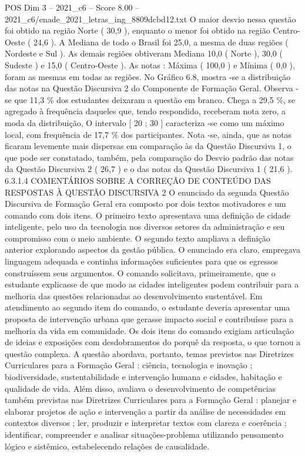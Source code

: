 \begin{textsample}{POS Dim 3 – 2021\_c6 – Score 8.00 – 2021\_c6/enade\_2021\_letras\_ing\_8809dcbd12.txt}
O maior desvio nessa questão foi obtido na região Norte ( 30,9 ), enquanto o menor foi obtido na região Centro-Oeste ( 24,6 ).
A Mediana de todo o Brasil foi 25,0, a mesma de duas regiões ( Nordeste e Sul ).
As demais regiões obtiveram Mediana 10,0 ( Norte ), 30,0 ( Sudeste ) e 15,0 ( Centro-Oeste ).
As notas : Máxima ( 100,0 ) e Mínima ( 0,0 ), foram as mesmas em todas as regiões.
No Gráfico 6.8, mostra -se a distribuição das notas na Questão Discursiva 2 do Componente de Formação Geral.
Observa -se que 11,3 \% dos estudantes deixaram a questão em branco.
Chega a 29,5 \%, se agregado à frequência daqueles que, tendo respondido, receberam nota zero, a moda da distribuição, O intervalo [ 20 ; 30 ] caracteriza -se como um máximo local, com frequência de 17,7 \% dos participantes.
Nota -se, ainda, que as notas ficaram levemente mais dispersas em comparação às da Questão Discursiva 1, o que pode ser constatado, também, pela comparação do Desvio padrão das notas da Questão Discursiva 2 ( 26,7 ) e o das notas da Questão Discursiva 1 ( 21,6 ). 6.3.1.4 COMENTÁRIOS SOBRE A CORREÇÃO DE CONTEÚDO DAS RESPOSTAS À QUESTÃO DISCURSIVA 2 O enunciado da segunda Questão Discursiva de Formação Geral era composto por dois textos motivadores e um comando com dois itens.
O primeiro texto apresentava uma definição de cidade inteligente, pelo uso da tecnologia nos diversos setores da administração e seu compromisso com o meio ambiente.
O segundo texto ampliava a definição anterior explorando aspectos da gestão pública.
O enunciado era claro, empregava linguagem adequada e continha informações suficientes para que os egressos construíssem seus argumentos.
O comando solicitava, primeiramente, que o estudante explicasse de que modo as cidades inteligentes podem contribuir para a melhoria das questões relacionadas ao desenvolvimento sustentável.
Em atendimento ao segundo item do comando, o estudante deveria apresentar uma proposta de intervenção urbana que gerasse impacto social e contribuísse para a melhoria da vida em comunidade.
Os dois itens do comando exigiam articulação de ideias e exposições com desdobramentos do porquê da resposta, o que tornou a questão complexa.
A questão abordava, portanto, temas previstos nas Diretrizes Curriculares para a Formação Geral : ciência, tecnologia e inovação ; biodiversidade, sustentabilidade e intervenção humana e cidades, habitação e qualidade de vida.
Além disso, avaliava o desenvolvimento de competências também previstas nas Diretrizes Curriculares para a Formação Geral : planejar e elaborar projetos de ação e intervenção a partir da análise de necessidades em contextos diversos ; ler, produzir e interpretar textos com clareza e coerência ; identificar, compreender e analisar situações-problema utilizando pensamento lógico e sistêmico, estabelecendo relações de causalidade.

\end{textsample}
